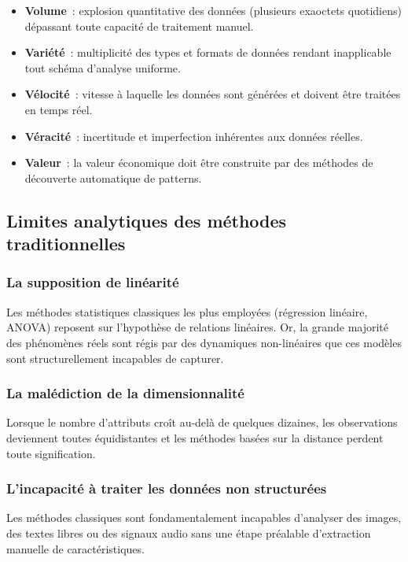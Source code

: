 \begin{itemize}[leftmargin=1.5cm, itemsep=3pt]
  \item \textbf{Volume}~: explosion quantitative des données (plusieurs exaoctets quotidiens) dépassant toute capacité de traitement manuel.
  \item \textbf{Variété}~: multiplicité des types et formats de données rendant inapplicable tout schéma d'analyse uniforme.
  \item \textbf{Vélocité}~: vitesse à laquelle les données sont générées et doivent être traitées en temps réel.
  \item \textbf{Véracité}~: incertitude et imperfection inhérentes aux données réelles.
  \item \textbf{Valeur}~: la valeur économique doit être construite par des méthodes de découverte automatique de patterns.
\end{itemize}

\subsection{Limites analytiques des méthodes traditionnelles}

\subsubsection{La supposition de linéarité}
Les méthodes statistiques classiques les plus employées (régression linéaire, ANOVA) reposent sur l'hypothèse de relations linéaires. Or, la grande majorité des phénomènes réels sont régis par des dynamiques non-linéaires que ces modèles sont structurellement incapables de capturer.

\subsubsection{La malédiction de la dimensionnalité}
Lorsque le nombre d'attributs croît au-delà de quelques dizaines, les observations deviennent toutes équidistantes et les méthodes basées sur la distance perdent toute signification.

\subsubsection{L'incapacité à traiter les données non structurées}
Les méthodes classiques sont fondamentalement incapables d'analyser des images, des textes libres ou des signaux audio sans une étape préalable d'extraction manuelle de caractéristiques.

